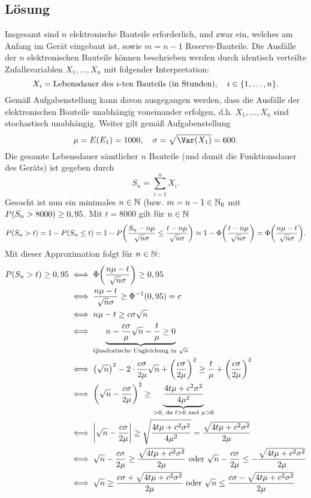 \documentclass{exercise}
\begin{document}
    \subsection*{Lösung}
    Insgesamt sind \(n\) elektronische Bauteile erforderlich, und zwar ein, welches am Anfang im Gerät eingebaut ist, sowie \(m = n - 1\) Reserve-Bauteile.
    Die Ausfälle der \(n\) elektronischen Bauteile können beschrieben werden durch identisch verteilte Zufallsvariablen \(X_1, \ldots, X_n\) mit folgender Interpretation:
    \[
        X_i = \text{Lebensdauer des }i\text{-ten Bauteils (in Stunden)}, \quad i \in \braces*{1, \ldots, n}.
    \]
    Gemäß Aufgabenstellung kann davon ausgegangen werden, dass die Ausfälle der elektronischen Bauteile unabhängig voneinander erfolgen, d.h. \(X_1, \ldots, X_n\) sind stochastisch unabhängig.
    Weiter gilt gemäß Aufgabenstellung
    \[
        \mu = E\parentheses*{E_1} = 1000, \quad \sigma = \sqrt{\Var\parentheses*{X_1}} = 600.
    \]
    Die gesamte Lebensdauer sämtlicher \(n\) Bauteile (und damit die Funktionsdauer des Geräts) ist gegeben durch
    \[
        S_n = \sum_{i = 1}^n X_i.
    \]
    Gesucht ist nun ein minimales \(n \in \mathbb{N}\) (bzw. \(m = n - 1 \in \mathbb{N}_0\) mit \(P\parentheses*{S_n > 8000} \ge 0,95\).
    Mit \(t = 8000\) gilt für \(n \in \mathbb{N}\)
    \[
        P\parentheses*{S_n > t} = 1 - P\parentheses*{S_n \le t} = 1 - P\parentheses*{\frac{S_n - n\mu}{\sqrt{n}\sigma} \le \frac{t - n\mu}{\sqrt{n}\sigma}} \approx 1 - \Phi\parentheses*{\frac{t - n\mu}{\sqrt{n}\sigma}} = \Phi\parentheses*{\frac{n\mu - t}{\sqrt{n}\sigma}}.
    \]
    Mit dieser Approximation folgt für \(n \in \mathbb{N}\):
    \begin{align*}
        P\parentheses*{S_n > t} \ge 0,95 & \iff \Phi\parentheses*{\frac{n\mu - t}{\sqrt{n}\sigma}} \ge 0,95\\
        &\iff \frac{n\mu - t}{\sqrt{n}\sigma} \ge \Phi^{-1}\parentheses*{0,95} = c\\
        &\iff n\mu - t \ge c\sigma\sqrt{n}\\
        &\iff \underbrace{n - \frac{c\sigma}{\mu}\sqrt{n} - \frac{t}{\mu} \ge 0}_{\text{Quadratische Ungleichung in }\sqrt{n}}\\
        &\iff \parentheses*{\sqrt{n}}^2 - 2 \cdot \frac{c\sigma}{2\mu}\sqrt{n} + \parentheses*{\frac{c\sigma}{2\mu}}^2 \ge \frac{t}{\mu} + \parentheses*{\frac{c\sigma}{2\mu}}^2\\
        &\iff \parentheses*{\sqrt{n} - \frac{c\sigma}{2\mu}}^2 \ge \underbrace{\frac{4t\mu + c^2 \sigma^2}{4\mu^2}}_{> 0\text{, da }t > 0\text{ und }\mu > 0}\\
        &\iff \absolute*{\sqrt{n} - \frac{c\sigma}{2\mu}} \ge \sqrt{\frac{4t\mu + c^2 \sigma^2}{4\mu^2}} = \frac{\sqrt{4t\mu + c^2 \sigma^2}}{2\mu}\\
        &\iff \sqrt{n} - \frac{c\sigma}{2\mu} \ge \frac{\sqrt{4t\mu + c^2 \sigma^2}}{2\mu}\text{ oder }\sqrt{n} - \frac{c\sigma}{2\mu} \le -\frac{\sqrt{4t\mu + c^2 \sigma^2}}{2\mu}\\
        &\iff \sqrt{n} \ge \frac{c\sigma + \sqrt{4t\mu + c^2 \sigma^2}}{2\mu}\text{ oder }\sqrt{n} \le \frac{c\sigma - \sqrt{4t\mu + c^2 \sigma^2}}{2\mu}
    \end{align*}
\end{document}
